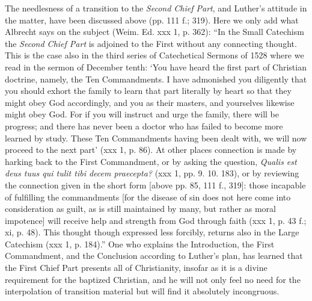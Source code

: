The needlesness of a transition to the \emph{Second Chief Part}, and Luther’s attitude in the matter, have been discussed above (pp. 111 f.; 319). Here we only add what Albrecht says on the subject (Weim. Ed. xxx 1, p. 362): “In the Small Catechism the \emph{Second Chief Part} is adjoined to the First without any connecting thought. This is the case also in the third series of Catechetical Sermons of 1528 where we read in the sermon of December tenth: ‘You have heard the first part of Christian doctrine, namely, the Ten Commandments. I have admonished you diligently that you should exhort the family to learn that part literally by heart so that they might obey God accordingly, and you as their masters, and yourselves likewise might obey God. For if you will instruct and urge the family, there will be progress; and there has never been a doctor who has failed to become more learned by study. These Ten Commandments having been dealt with, we will now proceed to the next part’ (xxx 1, p. 86). At other places
connection is made by harking back to the First Commandment, or by asking the question, \emph{Qualis est deus tuus qui tulit tibi decem praecepta?} (xxx 1, pp. 9. 10. 183), or by reviewing the connection given in the short form [above pp. 85, 111 f., 319]: those incapable of fulfilling the commandments [for the disease of sin does not here come into consideration as guilt, as is still maintained by many, but rather as moral impotence] will receive help and strength from God through faith (xxx 1, p. 43 f.; xi, p. 48). This thought though expressed less forcibly, returns also in the Large Catechism (xxx 1, p. 184).” One who explains the Introduction, the First Commandment, and the Conclusion according to Luther’s plan, has learned that the First Chief Part presents all of Christianity, insofar as it is a divine requirement for the baptized Christian, and he will not only feel no need for the interpolation of transition material but will find it absolutely incongruous.

